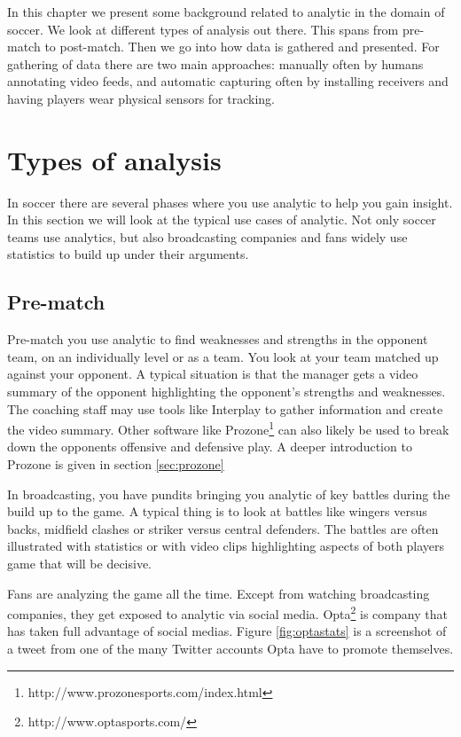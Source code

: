 In this chapter we present some background related to analytic in the domain of soccer. We look at different types of analysis out there. This spans from pre-match to post-match. Then we go into how data is gathered and presented. For gathering of data there are two main approaches: manually often by humans annotating video feeds, and automatic capturing often by installing receivers and having players wear physical sensors for tracking.

\section{Types of analysis}

In soccer there are several phases where you use analytic to help you gain insight. In this section we will look at the typical use cases of analytic. Not only soccer teams use analytics, but also broadcasting companies and fans widely use statistics to build up under their arguments.

\subsection{Pre-match}

Pre-match you use analytic to find weaknesses and strengths in the opponent team, on an individually level or as a team. You look at your team matched up against your opponent. A typical situation is that the manager gets a video summary of the opponent highlighting the opponent’s strengths and weaknesses. The coaching staff may use tools like Interplay to gather information and create the video summary. Other software like Prozone\footnote{http://www.prozonesports.com/index.html} can also likely be used to break down the opponents offensive and defensive play. A deeper introduction to Prozone is given in section \ref{sec:prozone}

In broadcasting, you have pundits bringing you analytic of key battles during the build up to the game. A typical thing is to look at battles like wingers versus backs, midfield clashes or striker versus central defenders. The battles are often illustrated with statistics or with video clips highlighting aspects of both players game that will be decisive. 

Fans are analyzing the game all the time. Except from watching broadcasting companies, they get exposed to analytic via social media. Opta\footnote{http://www.optasports.com/} is company that has taken full advantage of social medias. Figure \ref{fig:optastats} is a screenshot of a tweet from one of the many Twitter accounts Opta have to promote themselves. 

